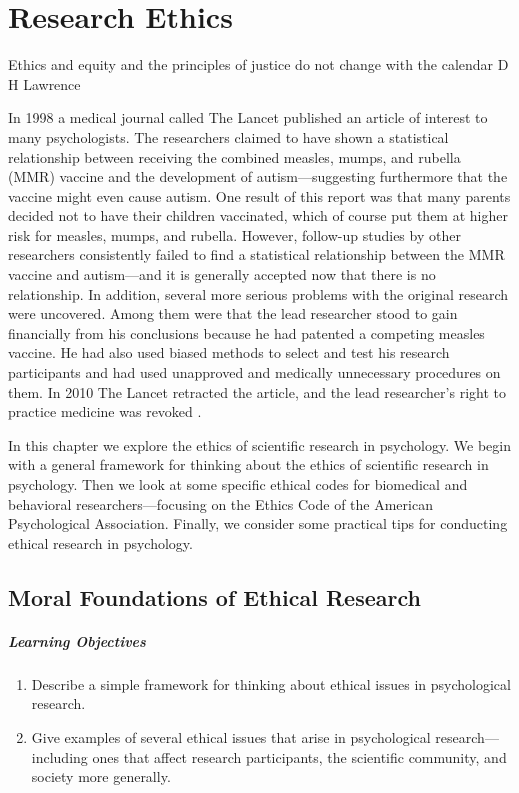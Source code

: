 \chapter{Research Ethics}

Ethics and equity and the principles of justice do not change with the calendar D H Lawrence

In 1998 a medical journal called The Lancet published an article of interest to many psychologists. The researchers claimed to have shown a statistical relationship between receiving the combined measles, mumps, and rubella (MMR) vaccine and the development of autism---suggesting furthermore that the vaccine might even cause autism. One result of this report was that many parents decided not to have their children vaccinated, which of course put them at higher risk for measles, mumps, and rubella. However, follow-up studies by other researchers consistently failed to find a statistical relationship between the MMR vaccine and autism---and it is generally accepted now that there is no relationship. In addition, several more serious problems with the original research were uncovered. Among them were that the lead researcher stood to gain financially from his conclusions because he had patented a competing measles vaccine. He had also used biased methods to select and test his research participants and had used unapproved and medically unnecessary procedures on them. In 2010 The Lancet retracted the article, and the lead researcher's right to practice medicine was revoked \citep{burns_council_2010}.

In this chapter we explore the ethics of scientific research in psychology. We begin with a general framework for thinking about the ethics of scientific research in psychology. Then we look at some specific ethical codes for biomedical and behavioral researchers---focusing on the Ethics Code of the American Psychological Association. Finally, we consider some practical tips for conducting ethical research in psychology.

\section{Moral Foundations of Ethical Research}

 \paragraph{Learning Objectives}
 \begin{enumerate}
 \item Describe a simple framework for thinking about ethical issues in psychological research.
\item Give examples of several ethical issues that arise in psychological research---including ones that affect research participants, the scientific community, and society more generally.
 \end{enumerate}


